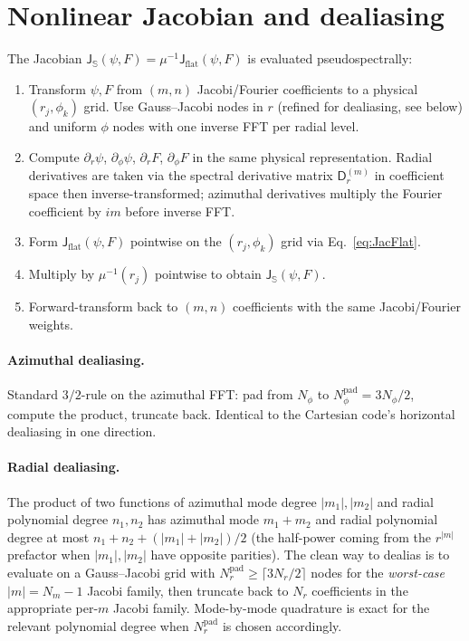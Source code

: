 \documentclass[11pt]{article}
\newcommand{\Jflat}{\mathsf{J}_{\mathrm{flat}}}
\newcommand{\Jsphere}{\mathsf{J}_{\mathbb{S}}}
\begin{document}
\section{Nonlinear Jacobian and dealiasing}
\label{sec:dealias}

The Jacobian $\Jsphere(\psi, F) = \mu^{-1} \Jflat(\psi, F)$ is
evaluated pseudospectrally:
\begin{enumerate}[leftmargin=2em,itemsep=2pt]
  \item Transform $\psi, F$ from $(m, n)$ Jacobi/Fourier coefficients
  to a physical $(r_{j}, \phi_{k})$ grid.  Use Gauss--Jacobi nodes in
  $r$ (refined for dealiasing, see below) and uniform $\phi$ nodes
  with one inverse FFT per radial level.
  \item Compute $\partial_{r}\psi$, $\partial_{\phi}\psi$,
  $\partial_{r}F$, $\partial_{\phi}F$ in the same physical
  representation.  Radial derivatives are taken via the spectral
  derivative matrix $\mathsf{D}_{r}^{(m)}$ in coefficient space then
  inverse-transformed; azimuthal derivatives multiply the Fourier
  coefficient by $i m$ before inverse FFT.
  \item Form $\Jflat(\psi, F)$ pointwise on the $(r_{j}, \phi_{k})$
  grid via Eq.~\eqref{eq:JacFlat}.
  \item Multiply by $\mu^{-1}(r_{j})$ pointwise to obtain
  $\Jsphere(\psi, F)$.
  \item Forward-transform back to $(m, n)$ coefficients with the
  same Jacobi/Fourier weights.
\end{enumerate}

\paragraph{Azimuthal dealiasing.}  Standard $3/2$-rule on the
azimuthal FFT: pad from $N_{\phi}$ to $N_{\phi}^{\mathrm{pad}} =
3N_{\phi}/2$, compute the product, truncate back.  Identical to the
Cartesian code's horizontal dealiasing in one direction.

\paragraph{Radial dealiasing.}  The product of two functions of
azimuthal mode degree $|m_{1}|, |m_{2}|$ and radial polynomial
degree $n_{1}, n_{2}$ has azimuthal mode $m_{1} + m_{2}$ and radial
polynomial degree at most $n_{1} + n_{2} + (|m_{1}| + |m_{2}|)/2$
(the half-power coming from the $r^{|m|}$ prefactor when
$|m_{1}|, |m_{2}|$ have opposite parities).  The clean way to
dealias is to evaluate on a Gauss--Jacobi grid with
$N_{r}^{\mathrm{pad}} \ge \lceil 3N_{r}/2 \rceil$ nodes for the
\emph{worst-case} $|m| = N_{m} - 1$ Jacobi family, then truncate
back to $N_{r}$ coefficients in the appropriate per-$m$ Jacobi
family.  Mode-by-mode quadrature is exact for the relevant
polynomial degree when $N_{r}^{\mathrm{pad}}$ is chosen accordingly.
\end{document}
